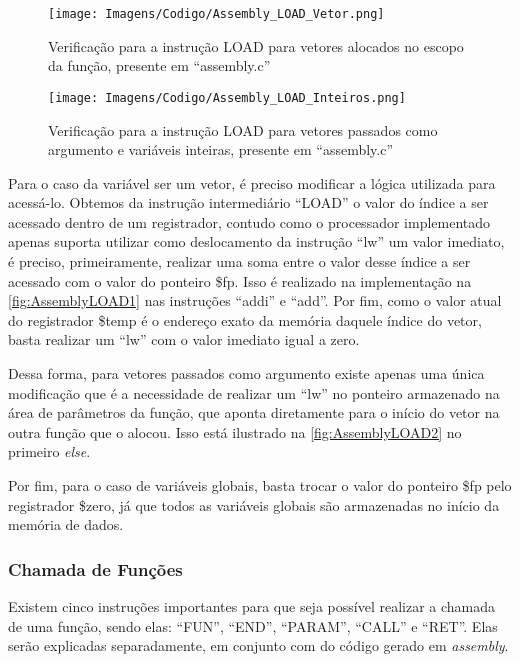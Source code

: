 \documentclass[
	12pt,				%
	oneside,
	a4paper,			%
	english,			%
	french,				%
	spanish,			%
	brazil,				%
	]{abntex2}
\begin{document}
\begin{figure}[htbp]
\centering 
\caption{Verificação para a instrução LOAD para vetores alocados no escopo da função, presente em \nohyphens{``assembly.c''}} 
\label{fig:AssemblyLOAD1}
\graphicspath{ {./Imagens/} } 
\texttt{[image: Imagens/Codigo/Assembly\_LOAD\_Vetor.png]}
\end{figure}

\begin{figure}[htbp]
\centering 
\caption{Verificação para a instrução LOAD para vetores passados como argumento e variáveis inteiras, presente em \nohyphens{``assembly.c''}} 
\label{fig:AssemblyLOAD2}
\graphicspath{ {./Imagens/} } 
\texttt{[image: Imagens/Codigo/Assembly\_LOAD\_Inteiros.png]}
\end{figure}

Para o caso da variável ser um vetor, é preciso modificar a lógica utilizada para acessá-lo. Obtemos da instrução intermediário ``LOAD'' o valor do índice a ser acessado dentro de um registrador, contudo como o processador implementado apenas suporta utilizar como deslocamento da instrução ``lw'' um valor imediato, é preciso, primeiramente, realizar uma soma entre o valor desse índice a ser acessado com o valor do ponteiro \$fp. Isso é realizado na implementação na \autoref{fig:AssemblyLOAD1} nas instruções ``addi'' e ``add''. Por fim, como o valor atual do registrador \$temp é o endereço exato da memória daquele índice do vetor, basta realizar um ``lw'' com o valor imediato igual a zero.

Dessa forma, para vetores passados como argumento existe apenas uma única modificação que é a necessidade de realizar um ``lw'' no ponteiro armazenado na área de parâmetros da função, que aponta diretamente para o início do vetor na outra função que o alocou. Isso está ilustrado na \autoref{fig:AssemblyLOAD2} no primeiro \emph{else}.


Por fim, para o caso de variáveis globais, basta trocar o valor do ponteiro \$fp pelo registrador \$zero, já que todos as variáveis globais são armazenadas no início da memória de dados.

\subsubsection{Chamada de Funções}

Existem cinco instruções importantes para que seja possível realizar a chamada de uma função, sendo elas: ``FUN'', ``END'', ``PARAM'', ``CALL'' e ``RET''. Elas serão explicadas separadamente, em conjunto com do código gerado em \emph{assembly}.
\end{document}
